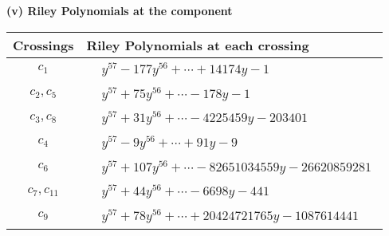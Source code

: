 \documentclass[1p]{elsarticle_modified}
\theoremstyle{definition}
\begin{document}
\newpage\renewcommand{\arraystretch}{1}
\flushleft \textbf{(v) Riley Polynomials at the component}\newline \\
\begin{tabular}{m{50pt}|m{274pt}}
Crossings & \hspace{64pt}Riley Polynomials at each crossing \\
\hline $$\begin{aligned}c_{1}\end{aligned}$$&$\begin{aligned}
&y^{57}-177 y^{56}+\cdots+14174 y-1
\end{aligned}$\\
\hline $$\begin{aligned}c_{2},c_{5}\end{aligned}$$&$\begin{aligned}
&y^{57}+75 y^{56}+\cdots-178 y-1
\end{aligned}$\\
\hline $$\begin{aligned}c_{3},c_{8}\end{aligned}$$&$\begin{aligned}
&y^{57}+31 y^{56}+\cdots-4225459 y-203401
\end{aligned}$\\
\hline $$\begin{aligned}c_{4}\end{aligned}$$&$\begin{aligned}
&y^{57}-9 y^{56}+\cdots+91 y-9
\end{aligned}$\\
\hline $$\begin{aligned}c_{6}\end{aligned}$$&$\begin{aligned}
&y^{57}+107 y^{56}+\cdots-82651034559 y-26620859281
\end{aligned}$\\
\hline $$\begin{aligned}c_{7},c_{11}\end{aligned}$$&$\begin{aligned}
&y^{57}+44 y^{56}+\cdots-6698 y-441
\end{aligned}$\\
\hline $$\begin{aligned}c_{9}\end{aligned}$$&$\begin{aligned}
&y^{57}+78 y^{56}+\cdots+20424721765 y-1087614441
\end{aligned}$\\

\end{tabular}
\end{document}
